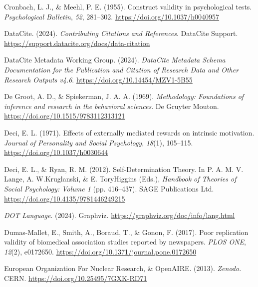 \documentclass[man]{apa7}
\newlength{\cslhangindent}
\newenvironment{CSLReferences}[2] %
 {\begin{list}{}{%
  \setlength{\itemindent}{0pt}
  \setlength{\leftmargin}{0pt}
  \setlength{\parsep}{0pt}
  \ifodd #1
   \setlength{\leftmargin}{\cslhangindent}
   \setlength{\itemindent}{-1\cslhangindent}
  \fi
  \setlength{\itemsep}{#2\baselineskip}}}
 {\end{list}}
\begin{document}
\begin{CSLReferences}{1}{0}
Cronbach, L. J., \& Meehl, P. E. (1955). Construct validity in psychological tests. \emph{Psychological Bulletin}, \emph{52}, 281--302. \url{https://doi.org/10.1037/h0040957}

DataCite. (2024). \emph{Contributing {Citations} and {References}}. DataCite Support. \url{https://support.datacite.org/docs/data-citation}

DataCite Metadata Working Group. (2024). \emph{{DataCite Metadata Schema Documentation} for the {Publication} and {Citation} of {Research Data} and {Other Research Outputs} v4.6}. \url{https://doi.org/10.14454/MZV1-5B55}

De Groot, A. D., \& Spiekerman, J. A. A. (1969). \emph{Methodology: {Foundations} of inference and research in the behavioral sciences}. De Gruyter Mouton. \url{https://doi.org/10.1515/9783112313121}

Deci, E. L. (1971). Effects of externally mediated rewards on intrinsic motivation. \emph{Journal of Personality and Social Psychology}, \emph{18}(1), 105--115. \url{https://doi.org/10.1037/h0030644}

Deci, E. L., \& Ryan, R. M. (2012). Self-{Determination Theory}. In P. A. M. V. Lange, A. W.Kruglanski, \& E. ToryHiggins (Eds.), \emph{Handbook of {Theories} of {Social Psychology}: {Volume} 1} (pp. 416--437). SAGE Publications Ltd. \url{https://doi.org/10.4135/9781446249215}

\emph{{DOT Language}}. (2024). Graphviz. \url{https://graphviz.org/doc/info/lang.html}

Dumas-Mallet, E., Smith, A., Boraud, T., \& Gonon, F. (2017). Poor replication validity of biomedical association studies reported by newspapers. \emph{PLOS ONE}, \emph{12}(2), e0172650. \url{https://doi.org/10.1371/journal.pone.0172650}

European Organization For Nuclear Research, \& OpenAIRE. (2013). \emph{Zenodo}. CERN. \url{https://doi.org/10.25495/7GXK-RD71}


\end{CSLReferences}
\end{document}
